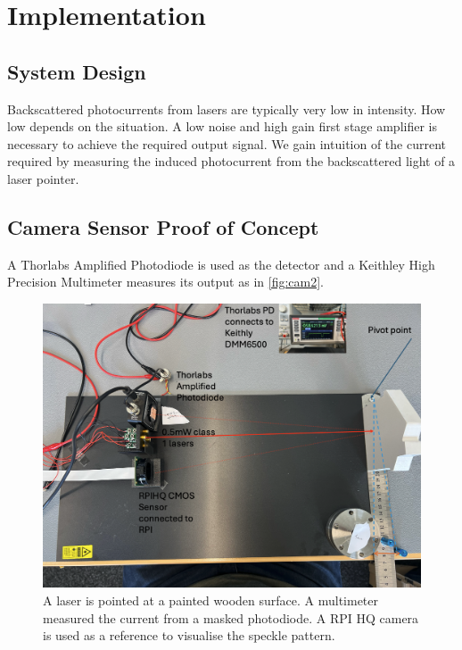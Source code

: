 \section{Implementation}
\label{sec:implementation}

\subsection{System Design}

Backscattered photocurrents from lasers are typically very low in intensity. How low depends on the situation. A low noise and high gain first stage amplifier is necessary to achieve the required output signal.  We gain intuition of the current required by measuring the induced photocurrent from the backscattered light of a laser pointer. 

\subsection{Camera Sensor Proof of Concept}
A Thorlabs Amplified Photodiode is used as the detector and a Keithley High Precision Multimeter measures its output as in \ref{fig:cam2}.

\begin{figure}[t]
  \centering
  \includegraphics[width=\widthnarrow]{figures/impl/camera_setup.png}
  \caption{A laser is pointed at a painted wooden surface. A multimeter measured the current from a masked photodiode. A RPI HQ camera is used as a reference to visualise the speckle pattern.}
  \label{fig:cam1}
\end{figure} 


